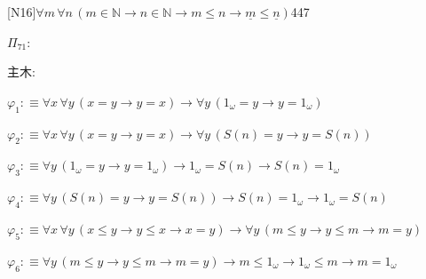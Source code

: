\begin{fullproof}{[N16]}{$\forall m\,\forall n\,(m \in \mathbb{N} \to n \in \mathbb{N} \to m \leq n \to \underline{m} \leq \underline{n})$}{447}
\begin{ptree}
\end{ptree}
\noindent$\Pi_{71}$:
\begin{ptree}
\noLine
{}
\end{ptree}
\noindent 主木:
\begin{ptree}
\noLine
{}
\end{ptree}
\begin{abbrevlist}
\item $\varphi_{1} :\equiv \forall x\,\forall y\,(x = y \to y = x) \to \forall y\,(1_{\omega} = y \to y = 1_{\omega})$
\item $\varphi_{2} :\equiv \forall x\,\forall y\,(x = y \to y = x) \to \forall y\,(S(n) = y \to y = S(n))$
\item $\varphi_{3} :\equiv \forall y\,(1_{\omega} = y \to y = 1_{\omega}) \to 1_{\omega} = S(n) \to S(n) = 1_{\omega}$
\item $\varphi_{4} :\equiv \forall y\,(S(n) = y \to y = S(n)) \to S(n) = 1_{\omega} \to 1_{\omega} = S(n)$
\item $\varphi_{5} :\equiv \forall x\,\forall y\,(x \leq y \to y \leq x \to x = y) \to \forall y\,(m \leq y \to y \leq m \to m = y)$
\item $\varphi_{6} :\equiv \forall y\,(m \leq y \to y \leq m \to m = y) \to m \leq 1_{\omega} \to 1_{\omega} \leq m \to m = 1_{\omega}$

\end{abbrevlist}
\end{fullproof}
